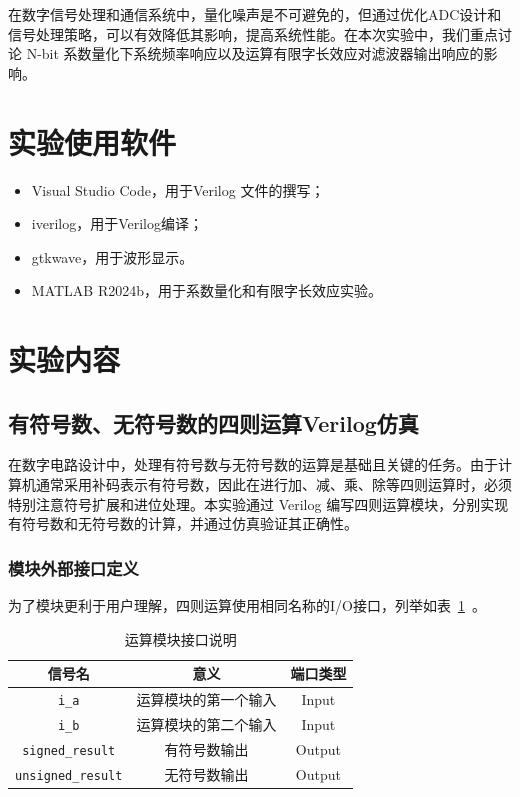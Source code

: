 在数字信号处理和通信系统中，量化噪声是不可避免的，但通过优化ADC设计和信号处理策略，可以有效降低其影响，提高系统性能。在本次实验中，我们重点讨论 N-bit 系数量化下系统频率响应以及运算有限字长效应对滤波器输出响应的影响。

\section{实验使用软件}
\begin{itemize}
  \item Visual Studio Code，用于Verilog 文件的撰写；
  \item iverilog，用于Verilog编译；
  \item gtkwave，用于波形显示。
  \item MATLAB R2024b，用于系数量化和有限字长效应实验。
\end{itemize}
\section{实验内容}
\subsection{有符号数、无符号数的四则运算Verilog仿真}
在数字电路设计中，处理有符号数与无符号数的运算是基础且关键的任务。由于计算机通常采用补码表示有符号数，因此在进行加、减、乘、除等四则运算时，必须特别注意符号扩展和进位处理。本实验通过 Verilog 编写四则运算模块，分别实现有符号数和无符号数的计算，并通过仿真验证其正确性。
\subsubsection{模块外部接口定义}
为了模块更利于用户理解，四则运算使用相同名称的I/O接口，列举如表~\ref{table:interface}~。
\begin{table}[htbp]
    \centering
    \begin{tabular}{ccc}
      \toprule
       信号名 & 意义 & 端口类型\\
      \midrule
        \texttt{i\_a} & 运算模块的第一个输入 & Input \\
       \texttt{i\_b} & 运算模块的第二个输入 & Input \\
       \texttt{signed\_result} & 有符号数输出 & Output \\
       \texttt{unsigned\_result} & 无符号数输出 & Output \\
      \bottomrule
    \end{tabular}
    \caption{运算模块接口说明}
    \label{table:interface}
\end{table}
